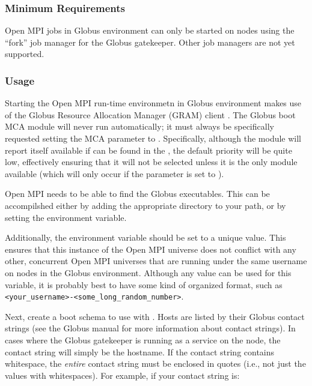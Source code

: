 
\subsubsection{Minimum Requirements}

Open MPI jobs in Globus environment can only be started on nodes using
the ``fork'' job manager for the Globus gatekeeper.  Other job
managers are not yet supported.


\subsubsection{Usage}

Starting the Open MPI run-time environmetn in Globus environment makes use
of the Globus Resource Allocation Manager (GRAM) client
.
%
The Globus boot MCA module will never run automatically; it must
always be specifically requested setting the  MCA
parameter to .  Specifically, although the
 module will report itself available if
 can be found in the , the default
priority will be quite low, effectively ensuring that it will not be
selected unless it is the only module available (which will only occur
if the  parameter is set to ).

Open MPI needs to be able to find the Globus executables.  This can be
accompilshed either by adding the appropriate directory to your path,
or by setting the  environment variable.

Additionally, the 
environment variable should be set to a unique value.  This ensures
that this instance of the Open MPI universe does not conflict with any
other, concurrent Open MPI universes that are running under the same
username on nodes in the Globus environment.  Although any value can
be used for this variable, it is probably best to have some kind of
organized format, such as {\tt
  <your\_\-username>-<some\_\-long\_\-random\_\-number>}.

Next, create a boot schema to use with .
%
Hosts are listed by their Globus contact strings (see the Globus
manual for more information about contact strings).  In cases where
the Globus gatekeeper is running as a  service on the node,
the contact string will simply be the hostname.  If the contact string
contains whitespace, the {\em entire} contact string must be enclosed
in quotes (i.e., not just the values with whitespaces).
%
For example, if your contact string is:

